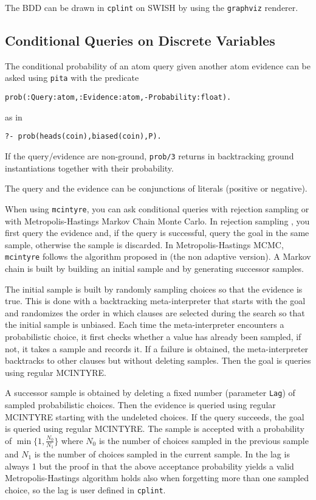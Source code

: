 The BDD can be drawn in \verb|cplint| on SWISH by using the \verb|graphviz| renderer.


\subsection{Conditional Queries on Discrete Variables}
\label{condq}
The conditional probability of an atom query given another atom evidence can be asked using \verb|pita| with the predicate
\begin{verbatim}
prob(:Query:atom,:Evidence:atom,-Probability:float).
\end{verbatim}
as in
\begin{verbatim}
?- prob(heads(coin),biased(coin),P).
\end{verbatim}
If the query/evidence are non-ground, \verb|prob/3| returns in backtracking ground instantiations together with their probability.

The query and the evidence can be conjunctions of literals (positive or negative).

When using \verb|mcintyre|, you can ask conditional queries with rejection sampling or with Metropolis-Hastings Markov Chain Monte Carlo.
In rejection sampling \cite{von195113}, you first query the evidence and, if the query is successful, query the goal in the same sample, otherwise
the sample is discarded.
In Metropolis-Hastings MCMC, \verb|mcintyre| follows the algorithm proposed in \cite{nampally2014adaptive} (the non adaptive version).
A Markov chain is built by building an initial sample and by generating successor samples.

The initial sample is built by  randomly sampling choices so that the evidence is true. This is done with
a backtracking meta-interpreter that starts with the goal and
randomizes the order in which clauses are selected during the search so that the initial sample is unbiased. Each time the meta-interpreter encounters
a probabilistic choice, it first checks whether a
value has already been sampled, if not, it takes
a sample and records it. If a failure is obtained,
the meta-interpreter backtracks to other clauses but
without deleting samples. Then the goal is queries using
regular MCINTYRE.

A successor sample is obtained by deleting a
fixed number (parameter \verb|Lag|) of sampled probabilistic choices. Then the
evidence is queried using regular MCINTYRE starting with the undeleted choices.
If the query succeeds, the goal is queried using regular MCINTYRE.
The sample is accepted with a probability of $\min\{1,\frac{N_0}{N_1}\}$ where $N_0$ is the number of choices sampled
in the previous sample and $N_1$ is the number of choices sampled in the current sample.
In \cite{nampally2014adaptive} the lag is always 1 but the proof in \cite{nampally2014adaptive} that the above acceptance
probability yields a valid
Metropolis-Hastings algorithm holds also when forgetting more than one
sampled choice, so the lag is
user defined in \verb|cplint|.

